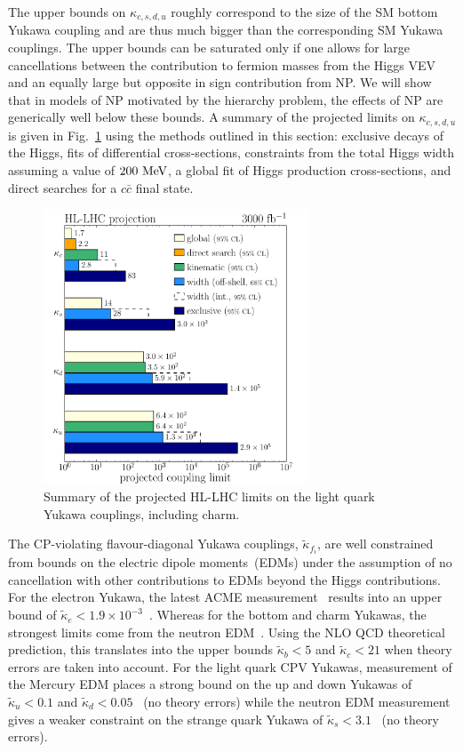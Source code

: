 \documentclass[../report.tex]{subfiles}
\begin{document}
The upper bounds on $\kappa_{c,s,d,u}$ roughly
correspond to the size of the SM bottom Yukawa coupling and are thus much bigger than the corresponding SM Yukawa couplings. The upper bounds can be saturated only if one allows for large cancellations between the
contribution to fermion masses from the Higgs VEV and an equally large
but opposite in sign contribution from NP. We will show that in models
of NP motivated by the hierarchy problem, the effects of NP are
generically well below these bounds. A summary of the projected limits on $\kappa_{c,s,d,u}$ is given in Fig.~\ref{fig:sec7:summary} using the methods outlined in this section: exclusive decays of the Higgs, fits of differential cross-sections, constraints from the total Higgs width assuming a value of $200~\mathrm{\text{MeV}}$, a global fit of Higgs production cross-sections, and direct searches for a $c\bar{c}$ final state.
\begin{figure}
    \centering
    \includegraphics[width=0.7\textwidth]{section7/plots/flavor_summary.pdf}
    \caption{Summary of the projected HL-LHC limits on the light quark Yukawa couplings, including charm.}
    \label{fig:sec7:summary}
\end{figure}

The CP-violating flavour-diagonal Yukawa couplings, $\tilde \kappa_{f_i}$,
are well constrained from bounds on the electric dipole moments~(EDMs)
\cite{Brod:2013cka,Chien:2015xha,Altmannshofer:2015qra,Brod:2018pli} under the assumption of no 
cancellation with other contributions to EDMs beyond the Higgs contributions.
For the electron Yukawa, the latest ACME measurement~\cite{Baron:2013eja,Andreev:2018ayy} results into an upper bound of $\tilde\kappa_e<1.9\times 10^{-3}$~\cite{Altmannshofer:2015qra}. Whereas for the bottom and charm Yukawas, the strongest limits come from the neutron EDM~\cite{Brod:2018pli}. Using the NLO QCD theoretical prediction, this translates into the upper bounds $\tilde\kappa_b<5$ and $\tilde\kappa_c<21$ when theory errors are taken into account.
For the light quark CPV Yukawas, measurement of the Mercury EDM places a strong bound on the up and down Yukawas of $\tilde\kappa_u<0.1$ and $\tilde\kappa_d<0.05$~\cite{Brod:2018xyz} (no theory errors) while the neutron EDM measurement gives a weaker constraint on the strange quark Yukawa of $\tilde\kappa_s<3.1$~\cite{Brod:2018xyz} (no theory errors).
\end{document}
